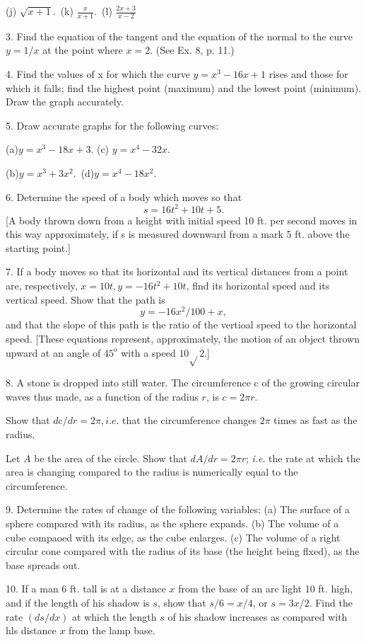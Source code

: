 \documentclass[12pt]{article}
\begin{document}
(j) $\sqrt{x+1}$.\
(k) $\displaystyle \frac{x}{x+1}$.\ 
(l) $\displaystyle \frac{2x+3}{x-2}$

3. Find the equation of the tangent and the equation of the normal
to the curve $y=1/x$ at the point where $x=2$. (See Ex. 8, p. 11.)

4. Find the values of x for which the curve $y=x^{3}-16x+1$ rises
and those for which it falls; find the highest point (maximum) and the
lowest point (minimum). Draw the graph accurately.

5. Draw accurate graphs for the following curves:

(a)$y=x^3-18x+3$. (c) $y=x^{4}-32x$.

(b)$y=x^{3}+3x^{2}$.\ (d)$y=x^{4}-18x^{2}$.

6. Determine the speed of a body which moves so that
$$
s=16t^{2}+10t+5.
$$
[A body thrown down from a height with initial speed 10 ft. per second 
moves in this way approximately, if s is measured downward from a
mark 5 ft. above the starting point.]

7. If a body moves so that its horizontal and its vertical distances
from a point are, respectively, $x=10t, y=-16t^{2}+10t$, flnd its 
horizontal speed and its vertical speed. Show that the path is
$$
y=-16x^{2}/100+x,
$$
and that the slope of this path is the ratio of the vertioal speed to the
horizontal speed. [These equations represent, approximately, the motion
of an object thrown upward at an angle of $45^{\mathrm{o}}$ with a speed $10\sqrt{}\overline{2}.$]

8. A stone is dropped into still water. The circumference $\mathrm{c}$ of the
growing circular waves thus made, as a function of the radius $r$, is $c=2\pi r$.

Show that $d\mathrm{c}/dr=2\pi, i.e$. that the circumference changes 
$2 \pi$ times as fast as the radius.

Let $A$ be the area of the circle. Show that $dA/dr=2\pi r$; {\it i.e}. the
rate at which the area is changing compared to the radius is numerically
equal to the circumference.

9. Determine the rates of change of the following variables:
(a) The surface of a sphere compared with its radius, as the sphere
expands.
(b) The volume of a cube compaoed with its edge, as the cube enlarges.
(c) The volume of a right circular cone compared with the radius of
its base (the height being flxed), as the base spreads out.

10. If a man 6 ft. tall is at a distance $x$ from the base of an arc light
10 ft. high, and if the length of his shadow is $s$, show that $s/6=x/4$, or
$s=3x/2$. Find the rate $(ds/dx)$ at which the length $s$ of his shadow
increases as compared with hls distance $x$ from the lamp base.
\end{document}
